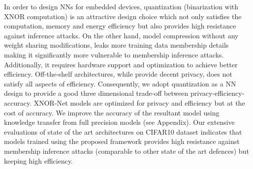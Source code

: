 In order to design NNs for embedded devices, quantization (binarization with XNOR computation) is an attractive design choice which not only satisfies the computation, memory and energy efficiency but also provides high resistance against inference attacks.
On the other hand, model compression without any weight sharing modifications, leaks more training data membership details making it significantly more vulnerable to membership inference attacks. Additionally, it requires hardware support and optimization to achieve better efficiency.
Off-the-shelf architectures, while provide decent privacy, does not satisfy all aspects of efficiency.
Consequently, we adopt quantization as a NN design to provide a good three dimensional trade-off between privacy-efficiency-accuracy.
XNOR-Net models are optimized for privacy and efficiency but at the cost of accuracy.
We improve the accuracy of the resultant model using knowledge transfer from full precision models (see Appendix).
Our extensive evaluations of state of the art architectures on CIFAR10 dataset indicates that models trained using the proposed framework provides high resistance against membership inference attacks (comparable to other state of the art defences) but keeping high efficiency.
